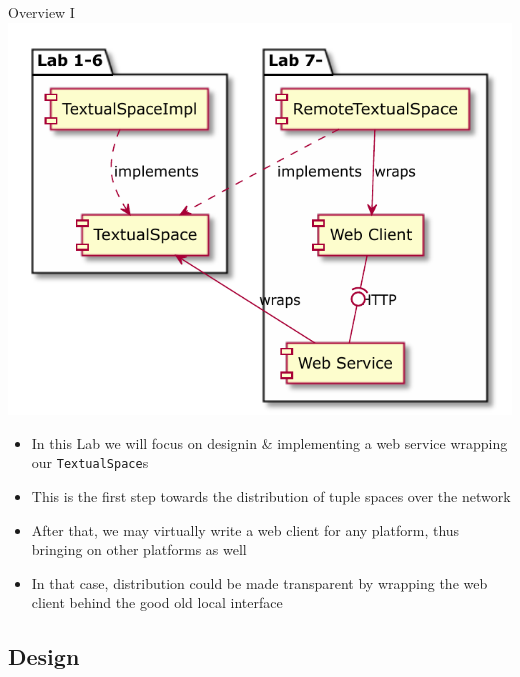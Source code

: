 \documentclass[presentation]{beamer}\mode<presentation>{\usetheme{AMSCesenaPurpleAndGold}}
\begin{document}
\begin{frame}[allowframebreaks]{Overview I}
    \centering
    \includegraphics[height=.8\textheight]{img/whole-picture.pdf}

    \bigskip

    \begin{itemize}
        \item In this Lab we will focus on designin \& implementing a \alert{web service} wrapping our \texttt{TextualSpace}s
        
        \bigskip
        
        \item This is the first step towards the \alert{distribution} of \linda{} tuple spaces over the network
        
        \bigskip
        
        \item After that, we may virtually write a \alert{web client} for any platform, thus bringing \linda{} on other platforms as well
        
        \bigskip
        
        \item In that case, distribution could be made \alert{transparent} by wrapping the web client behind the good old local interface
    \end{itemize}
\end{frame}

\subsection{Design}
\end{document}
